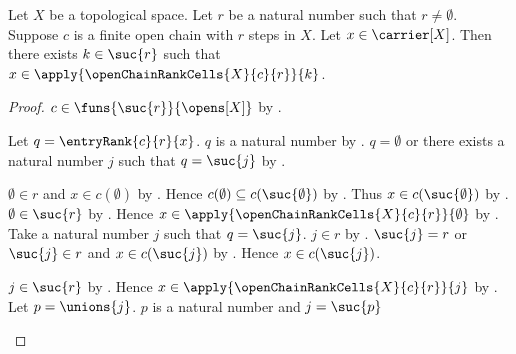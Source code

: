 \begin{theorem}\label{open_chain_rank_cells_cover_point}
    Let $X$ be a topological space.
    Let $r$ be a natural number such that $r\neq\emptyset$.
    Suppose $c$ is a finite open chain with $r$ steps in $X$.
    Let $x\in\carrier[X]$.
    Then there exists $k\in\suc{r}$ such that
        $x\in\apply{\openChainRankCells{X}{c}{r}}{k}$.
\end{theorem}
\begin{proof}
    $c\in\funs{\suc{r}}{\opens[X]}$
        by .
    \begin{byCase}
            Let $q=\entryRank{c}{r}{x}$.
            $q$ is a natural number by .
            $q=\emptyset$ or there exists a natural number $j$ such that
                $q=\suc{j}$ by .
            \begin{byCase}
                    $\emptyset\in r$ and $x\in c(\emptyset)$
                        by .
                    Hence $c(\emptyset)\subseteq c(\suc{\emptyset})$
                        by .
                    Thus $x\in c(\suc{\emptyset})$ by .
                    $\emptyset\in\suc{r}$ by .
                    Hence
                        $x\in
                            \apply{\openChainRankCells{X}{c}{r}}{\emptyset}$
                        by .
                    Take a natural number $j$ such that $q=\suc{j}$.
                    $j\in r$
                        by .
                    $\suc{j}=r$ or
                        $\suc{j}\in r$ and $x\in c(\suc{j})$
                        by .
                    Hence $x\in c(\suc{j})$.
                    \begin{byCase}
                            $j\in\suc{r}$ by .
                            Hence
                                $x\in\apply{
                                    \openChainRankCells{X}{c}{r}}{j}$
                                by
                                .
                            Let $p=\unions{j}$.
                            $p$ is a natural number and $j=\suc{p}$

\end{byCase}
\end{byCase}
\end{byCase}
\end{proof}
